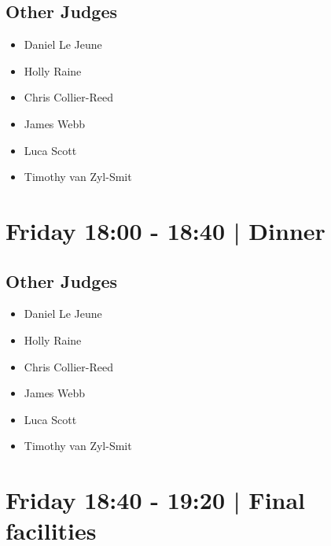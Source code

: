 \documentclass[10pt, A5]{article}
\begin{document}
                
        \subsection*{Other Judges}
        
            \begin{itemize}
                            \item Daniel Le Jeune
                            \item Holly Raine
                            \item Chris Collier-Reed
                            \item James Webb
                            \item Luca Scott
                            \item Timothy van Zyl-Smit
                        \end{itemize}
        

            \section*{Friday 18:00
        -
        18:40
        |
         Dinner }
        
                
        \subsection*{Other Judges}
        
            \begin{itemize}
                            \item Daniel Le Jeune
                            \item Holly Raine
                            \item Chris Collier-Reed
                            \item James Webb
                            \item Luca Scott
                            \item Timothy van Zyl-Smit
                        \end{itemize}
        

            \section*{Friday 18:40
        -
        19:20
        |
         Final facilities}
        
                
\end{document}
